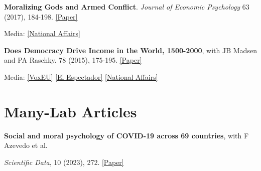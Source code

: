 \documentclass[letterpaper]{article}
\renewenvironment{itemize}{
  \begin{list}{}{
    \setlength{\leftmargin}{1.5em}
  }
}{
  \end{list}
}
\begin{document}
\begin{itemize}
	
	\medskip
	
				  \item \begin{flushleft} {\bf Moralizing Gods and Armed Conflict}. \linebreak \textit{Journal of Economic Psychology} 63 (2017), 184-198. \href{https://drive.google.com/file/d/0BwqbQjw0aU48bWlWVkEwRC1Ma0E/view?usp=sharing}{[Paper]} 
				  \end{flushleft}			  
				  	\vspace{-0.05in}
				  \begin{itemize}
				  	Media: \href{https://www.nationalaffairs.com/blog/detail/findings-a-daily-roundup/blessed-and-cursed}{[National Affairs]}
				  \end{itemize}
				  
	
	\medskip
	
\item {\bf Does Democracy Drive Income in the World, 1500-2000}, with JB Madsen and PA Raschky.  78 (2015), 175-195. \href{http://www.sciencedirect.com/science/article/pii/S0014292115000707}{[Paper]} 
				  
\vspace{-0.05in}
\begin{itemize}
	Media: \href{https://voxeu.org/article/revisiting-causal-effect-democracy-long-run-development}{[VoxEU]} \href{https://blogs.elespectador.com/economia/el-mal-economista/y-la-democracia-para-que}{[El Espectador]} \href{https://www.nationalaffairs.com/blog/detail/findings-a-daily-roundup/backward}{[National Affairs]}
\end{itemize}

\end{itemize}

\section*{Many-Lab Articles}

		\begin{itemize}
	\item \textbf{Social and moral psychology of COVID-19 across 69 countries}, with F Azevedo et al. 
			\vspace{-0.05in}
	\item \textit{Scientific Data}, 10 (2023), 272.  \href{https://psyarxiv.com/a3562/}{[Paper]}
\end{itemize}
\end{document}
